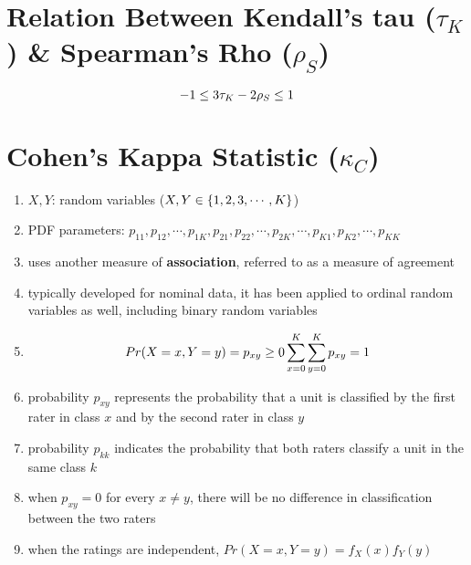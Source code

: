 \section{Relation Between Kendall’s tau ($\tau_K$) \& Spearman’s Rho ($\rho_S$) \cite{ism-1}}\label{Relation Between Kendall’s tau and Spearman’s Rho}

\[
    \hfill
    -1 \leq 3\tau_K - 2\rho_S \leq 1
    \hfill
\]


\section{Cohen’s Kappa Statistic ($\kappa_C$) \cite{ism-1}} \label{Multivariate Distributions: Cohen’s Kappa Statistic}

\begin{enumerate}
    \item[] $X, Y$: random variables ($X, Y \in \left\{1, 2, 3,\cdots, K\right\}$) 

    \item[] PDF parameters: $p_{11}, p_{12},\cdots, p_{1K}, p_{21}, p_{22},\cdots, p_{2K},\cdots, p_{K1}, p_{K2},\cdots, p_{KK}$ 
    
    \item uses another measure of \textbf{association}, referred to as a measure of agreement

    \item typically developed for nominal data, it has been applied to ordinal random variables as well, including binary random variables

    \item[] \[
        \hfill
        Pr(X=x,Y=y) = p_{xy} \geq 0
        \hfill
        \dsum_{x=0}^K \dsum_{y=0}^K p_{xy} = 1
        \hfill
    \] 

    \item probability $p_{xy}$ represents the probability that a unit is classified by the first rater in class $x$ and by the second rater in class $y$

    \item probability $p_{kk}$ indicates the probability that both raters classify a unit in the same class $k$

    \item when $p_{xy} = 0$ for every $x \neq y$, there will be no difference in classification between the two raters

    \item when the ratings are independent, $Pr(X = x, Y = y) = f_X(x)f_Y(y)$


\end{enumerate}

